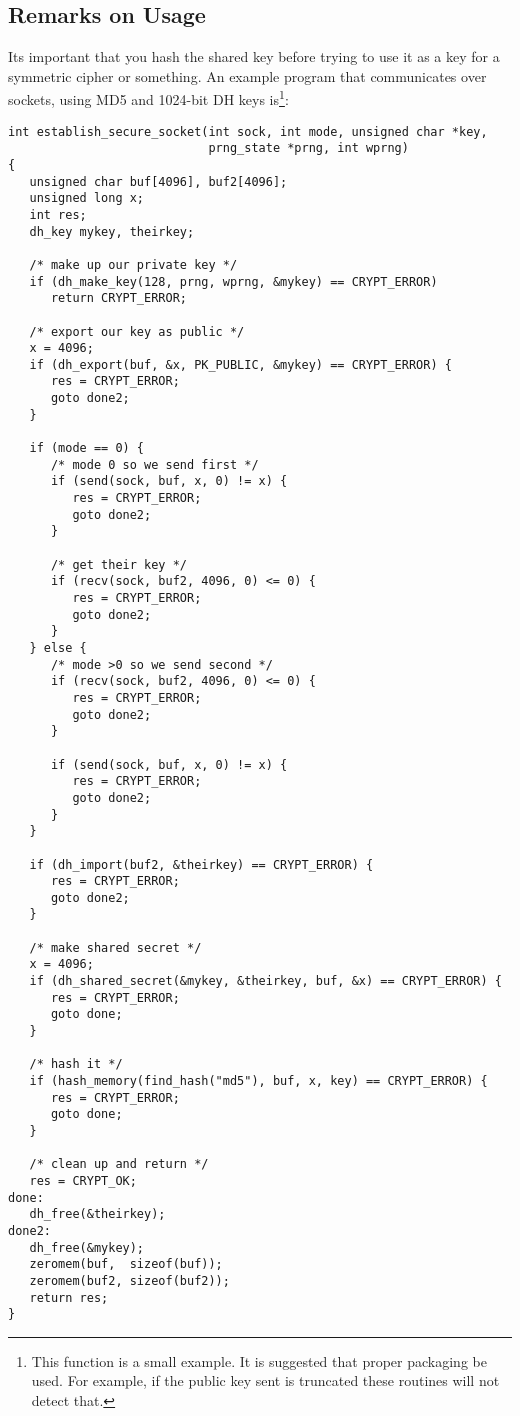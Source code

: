 \documentclass{book}
\begin{document}
\subsection{Remarks on Usage}
Its important that you hash the shared key before trying to use it as a key for a symmetric cipher or something.  An 
example program that communicates over sockets, using MD5 and 1024-bit DH keys is\footnote{This function is a small example.  It is suggested that proper packaging be used.  For example, if the public key sent is truncated these routines will not detect that.}:
\newpage
\begin{small}
\begin{verbatim}
int establish_secure_socket(int sock, int mode, unsigned char *key, 
                            prng_state *prng, int wprng)
{
   unsigned char buf[4096], buf2[4096];
   unsigned long x;
   int res;
   dh_key mykey, theirkey;

   /* make up our private key */
   if (dh_make_key(128, prng, wprng, &mykey) == CRYPT_ERROR) 
      return CRYPT_ERROR;

   /* export our key as public */ 
   x = 4096;
   if (dh_export(buf, &x, PK_PUBLIC, &mykey) == CRYPT_ERROR) {
      res = CRYPT_ERROR;
      goto done2;
   }

   if (mode == 0) {
      /* mode 0 so we send first */
      if (send(sock, buf, x, 0) != x) {
         res = CRYPT_ERROR;
         goto done2;
      }          

      /* get their key */
      if (recv(sock, buf2, 4096, 0) <= 0) {
         res = CRYPT_ERROR;
         goto done2;
      }
   } else {
      /* mode >0 so we send second */
      if (recv(sock, buf2, 4096, 0) <= 0) {
         res = CRYPT_ERROR;
         goto done2;
      }

      if (send(sock, buf, x, 0) != x) {
         res = CRYPT_ERROR;
         goto done2;
      }
   }

   if (dh_import(buf2, &theirkey) == CRYPT_ERROR) { 
      res = CRYPT_ERROR;
      goto done2;
   }

   /* make shared secret */
   x = 4096;
   if (dh_shared_secret(&mykey, &theirkey, buf, &x) == CRYPT_ERROR) {
      res = CRYPT_ERROR;
      goto done;
   }
 
   /* hash it */
   if (hash_memory(find_hash("md5"), buf, x, key) == CRYPT_ERROR) {
      res = CRYPT_ERROR;
      goto done;
   }

   /* clean up and return */
   res = CRYPT_OK;
done:
   dh_free(&theirkey);
done2:
   dh_free(&mykey);
   zeromem(buf,  sizeof(buf));
   zeromem(buf2, sizeof(buf2));
   return res;
}
\end{verbatim}
\end{small}
\newpage
\end{document}
